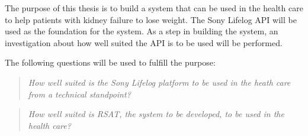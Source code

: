 \documentclass{cslthse-msc}
\begin{document}
The purpose of this thesis is to build a system that can be used in the health care to help patients with kidney failure to lose weight. The Sony Lifelog API will be used as the foundation for the system. As a step in building the system, an investigation about how well suited the API is to be used will be performed. 

The following questions will be used to fulfill the purpose: 

\begin{quote}
\centering
\emph{How well suited is the Sony Lifelog platform to be used in the heath care from a technical standpoint?}
\end{quote}

\begin{quote}
\centering
\emph{How well suited is RSAT, the system to be developed, to be used in the health care?}
\end{quote}

\end{document}
